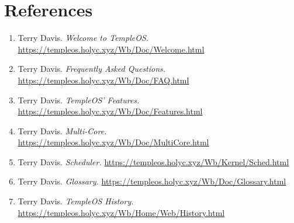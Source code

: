 \documentclass[11pt]{article}
\begin{document}
 \newpage

\section{References}
\label{sec:orgb050bc1}

\begin{enumerate}
\item Terry Davis. \emph{Welcome to TempleOS.}
\url{https://templeos.holyc.xyz/Wb/Doc/Welcome.html}

\item Terry Davis. \emph{Frequently Asked Questions.}
\url{https://templeos.holyc.xyz/Wb/Doc/FAQ.html}

\item Terry Davis. \emph{TempleOS' Features.}
\url{https://templeos.holyc.xyz/Wb/Doc/Features.html}

\item Terry Davis. \emph{Multi-Core.}
\url{https://templeos.holyc.xyz/Wb/Doc/MultiCore.html}

\item Terry Davis. \emph{Scheduler.}
\url{https://templeos.holyc.xyz/Wb/Kernel/Sched.html}

\item Terry Davis. \emph{Glossary.}
\url{https://templeos.holyc.xyz/Wb/Doc/Glossary.html}

\item Terry Davis. \emph{TempleOS History.}
\url{https://templeos.holyc.xyz/Wb/Home/Web/History.html}
\end{enumerate}
\end{document}

